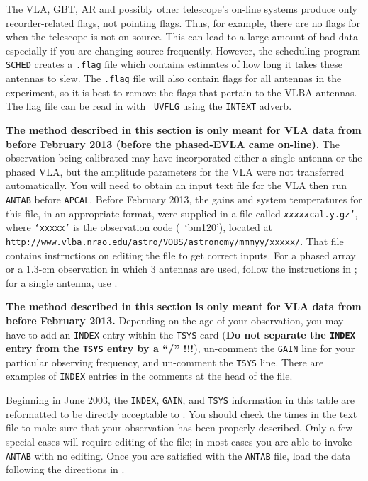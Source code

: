 
The VLA, GBT, AR and possibly other telescope's on-line systems produce
only recorder-related flags, not pointing flags.  Thus, for example, there
are no flags for when the telescope is not on-source.  This can lead to a
large amount of bad data  especially if you are changing source frequently.
However, the  scheduling program {\tt SCHED} creates a {\tt *.flag}
file which contains estimates of how long it takes these antennas to
slew.  The {\tt *.flag} file will also contain flags for all
antennas in the experiment, so it is best to remove the flags that
pertain to the VLBA antennas.  The flag file can be read in with {\tt
UVFLG} using the {\tt INTEXT} adverb.


{\bf The method described in this section is only meant for VLA data
from before February 2013 (before the phased-EVLA came on-line).}
The observation being calibrated may have incorporated either a single
 antenna or the phased VLA, but the amplitude
 parameters for the VLA were not transferred
automatically.  You will need to obtain an input text file for the VLA
then run {\tt ANTAB} before {\tt APCAL}\@.  Before February 2013,
the gains and system temperatures for this file, in an appropriate
format, were supplied in a file called {\tt {\it xxxxx}cal.y.gz'},
where {\tt `{\it xxxxx}'} is the observation code (\eg\ `bm120'),
located at {\tt http://www.vlba.nrao.edu/astro/VOBS/astronomy/mmmyy/xxxxx/}.
That file contains instructions on editing the file to get correct
inputs.  For a phased array or a 1.3-cm observation in which 3
antennas are used, follow the instructions in ; for a
single antenna, use \@.


{\bf The method described in this section is only meant
for VLA data from before February 2013.}
Depending on the age of your observation, you may have to add an
{\tt INDEX} entry within the {\tt TSYS}
card ({\bf Do not separate the {\tt INDEX} entry from the {\tt TSYS}
entry by a ``/'' !!!}), un-comment the {\tt GAIN} line for your
particular observing frequency, and un-comment the {\tt TSYS} line.
There are examples of {\tt INDEX} entries in the comments at the head
of the file.

Beginning in June 2003, the {\tt INDEX}, {\tt GAIN}, and {\tt TSYS}
information in this table are reformatted to be directly acceptable to
\AIPS\@.  You should check the times in the text file to make sure
that your observation has been properly described.  Only a few special
cases will require editing of the file; in most cases you are able to
invoke {\tt ANTAB} with no editing.  Once you are satisfied with the
{\tt ANTAB} file, load the data following the directions in .

